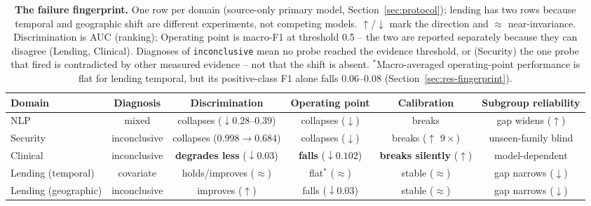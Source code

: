 \documentclass[11pt]{article}
\begin{document}
\begin{table}[t]
\centering
\caption{\textbf{The failure fingerprint.} One row per domain (source-only primary model,
Section~\ref{sec:protocol}); lending has two rows because temporal and geographic shift are
different experiments, not competing models. $\uparrow$/$\downarrow$ mark the direction and
$\approx$ near-invariance. Discrimination is AUC (ranking); Operating point is macro-F1 at
threshold 0.5 -- the two are reported separately because they can disagree (Lending, Clinical).
Diagnoses of \texttt{inconclusive} mean no probe reached the evidence threshold, or (Security) the
one probe that fired is contradicted by other measured evidence -- not that the shift is absent.
$^{*}$Macro-averaged operating-point performance is flat for lending temporal, but its
positive-class F1 alone falls $0.06$--$0.08$ (Section~\ref{sec:res-fingerprint}).}
\label{tab:fingerprint}
\footnotesize
\begin{tabular}{lccccc}
\toprule
Domain & Diagnosis & Discrimination & Operating point & Calibration & Subgroup reliability \\
\midrule
NLP & mixed & collapses ($\downarrow0.28$--$0.39$) & collapses ($\downarrow$) & breaks & gap widens ($\uparrow$) \\
Security & inconclusive & collapses ($0.998\!\rightarrow\!0.684$) & collapses ($\downarrow$) & breaks ($\uparrow$ $9\times$) & unseen-family blind \\
\rowcolor{hlrow} Clinical & inconclusive & \textbf{degrades less} ($\downarrow0.03$) & \textbf{falls} ($\downarrow0.102$) & \textbf{breaks silently} ($\uparrow$) & model-dependent \\
Lending (temporal) & covariate & holds/improves ($\approx$) & flat$^{*}$ ($\approx$) & stable ($\approx$) & gap narrows ($\downarrow$) \\
Lending (geographic) & inconclusive & improves ($\uparrow$) & falls ($\downarrow0.03$) & stable ($\approx$) & gap narrows ($\downarrow$) \\
\bottomrule
\end{tabular}
\end{table}
\end{document}
